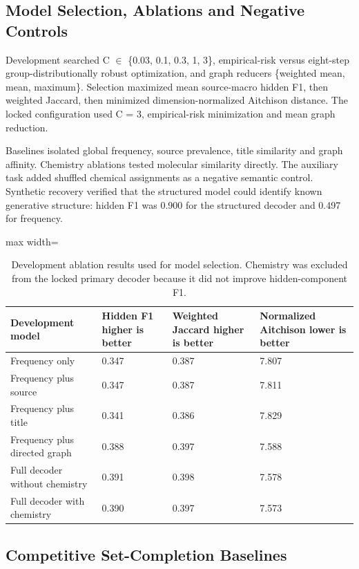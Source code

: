 \documentclass[11pt]{article}
\begin{document}
\subsection{Model Selection, Ablations and Negative Controls}

Development searched C \ensuremath{\in} \{0.03, 0.1, 0.3, 1, 3\}, empirical-risk versus eight-step group-distributionally robust optimization, and graph reducers \{weighted mean, mean, maximum\}. Selection maximized mean source-macro hidden F1, then weighted Jaccard, then minimized dimension-normalized Aitchison distance. The locked configuration used C = 3, empirical-risk minimization and mean graph reduction.

Baselines isolated global frequency, source prevalence, title similarity and graph affinity. Chemistry ablations tested molecular similarity directly. The auxiliary task added shuffled chemical assignments as a negative semantic control. Synthetic recovery verified that the structured model could identify known generative structure: hidden F1 was 0.900 for the structured decoder and 0.497 for frequency.

\begin{table}[htbp]
\centering
\small
\caption{Development ablation results used for model selection. Chemistry was excluded from the locked primary decoder because it did not improve hidden-component F1.}
\label{tab:2}
\begin{adjustbox}{max width=\linewidth}
\begin{tabular}{@{}llll@{}}
\toprule
\textbf{Development model} & \textbf{Hidden F1 higher is better} & \textbf{Weighted Jaccard higher is better} & \textbf{Normalized Aitchison lower is better} \\
\midrule
Frequency only & 0.347 & 0.387 & 7.807 \\
Frequency plus source & 0.347 & 0.387 & 7.811 \\
Frequency plus title & 0.341 & 0.386 & 7.829 \\
Frequency plus directed graph & 0.388 & 0.397 & 7.588 \\
Full decoder without chemistry & 0.391 & 0.398 & 7.578 \\
Full decoder with chemistry & 0.390 & 0.397 & 7.573 \\
\bottomrule
\end{tabular}
\end{adjustbox}
\end{table}

\subsection{Competitive Set-Completion Baselines}
\end{document}
